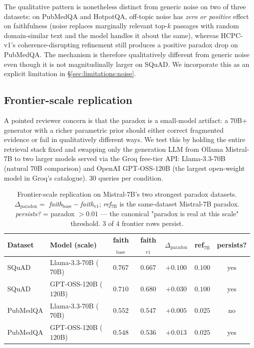 The qualitative pattern is nonetheless distinct from generic noise on
two of three datasets: on PubMedQA and HotpotQA, off-topic noise has
\emph{zero or positive} effect on faithfulness (noise replaces
marginally relevant top-$k$ passages with random domain-similar text
and the model handles it about the same), whereas HCPC-v1's
coherence-disrupting refinement still produces a positive paradox drop
on PubMedQA. The mechanism is therefore qualitatively different from
generic noise even though it is not magnitudinally larger on SQuAD. We
incorporate this as an explicit limitation in
\S\ref{sec:limitations:noise}.

\subsection{Frontier-scale replication}
\label{sec:rob:frontier}

A pointed reviewer concern is that the paradox is a small-model
artifact: a $70$B+ generator with a richer parametric prior should
either correct fragmented evidence or fail in qualitatively different
ways. We test this by holding the entire retrieval stack fixed and
swapping only the generation LLM from Ollama Mistral-$7$B to two
larger models served via the Groq free-tier API: Llama-$3.3$-$70$B
(natural $70$B comparison) and OpenAI GPT-OSS-$120$B (the largest
open-weight model in Groq's catalogue). $30$ queries per condition.



\begin{table}[!htb]
\centering
\caption{Frontier-scale replication on Mistral-7B's two strongest
paradox datasets. \emph{$\Delta_{\textrm{paradox}}=$ faith$_{\textrm{base}}-$faith$_{\textrm{v1}}$};
\emph{ref$_{7\textrm{B}}$} is the same-dataset Mistral-$7$B paradox.
\emph{persists?} = paradox $> 0.01$ — the canonical "paradox is real
at this scale" threshold. $3$ of $4$ frontier rows persist.}
\label{tab:frontier}
\footnotesize
\begin{tabular}{llccccc}
\toprule
Dataset & Model (scale) & faith$_{\textrm{base}}$ & faith$_{\textrm{v1}}$ & $\Delta_{\textrm{paradox}}$ & ref$_{7\textrm{B}}$ & persists? \\
\midrule
SQuAD     & Llama-3.3-70B  ($70$B)   & $0.767$ & $0.667$ & $\mathbf{+0.100}$ & $0.100$ & yes \\
SQuAD     & GPT-OSS-120B   ($120$B)  & $0.710$ & $0.680$ & $+0.030$ & $0.100$ & yes \\
PubMedQA  & Llama-3.3-70B  ($70$B)   & $0.552$ & $0.547$ & $+0.005$ & $0.025$ & no  \\
PubMedQA  & GPT-OSS-120B   ($120$B)  & $0.548$ & $0.536$ & $+0.013$ & $0.025$ & yes \\
\bottomrule
\end{tabular}
\end{table}

